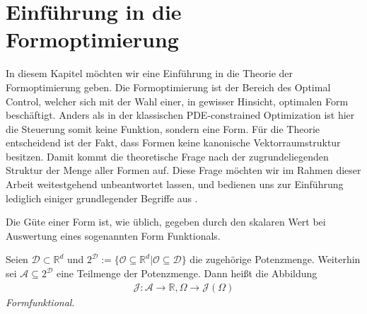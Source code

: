 


\section{Einführung in die Formoptimierung}

In diesem Kapitel möchten wir eine Einführung in die Theorie der Formoptimierung geben.
Die Formoptimierung ist der Bereich des Optimal Control, welcher sich mit der Wahl einer, in gewisser Hinsicht, optimalen Form beschäftigt. Anders als in der klassischen PDE-constrained Optimization ist hier die Steuerung somit keine Funktion, sondern eine Form. Für die Theorie entscheidend ist der Fakt, dass Formen keine kanonische Vektorraumstruktur besitzen. Damit kommt die theoretische Frage nach der zugrundeliegenden Struktur der Menge aller Formen auf. Diese Frage möchten wir im Rahmen dieser Arbeit weitestgehend unbeantwortet lassen, und bedienen uns zur Einführung lediglich einiger grundlegender Begriffe aus \cite{shape_space}.

Die Güte einer Form ist, wie üblich, gegeben durch den skalaren Wert bei Auswertung eines sogenannten Form Funktionals.

\begin{defi}[Formfunktional] %
Seien $\mathcal{D}\subset \mathbb{R}^d$ und $2^{\mathcal{D}} := \{ \mathcal{O} \subseteq \mathbb{R}^d \vert \mathcal{O} \subseteq \mathcal{D}\}$ die zugehörige Potenzmenge. Weiterhin sei $\mathcal{A} \subseteq 2^{\mathcal{D}}$ eine Teilmenge der Potenzmenge. Dann heißt die Abbildung 
\begin{align*}
\mathcal{J}: \mathcal{A} \rightarrow \mathbb{R}, \Omega \rightarrow \mathcal{J}(\Omega)
\end{align*}
\textit{Formfunktional}.
\end{defi}
